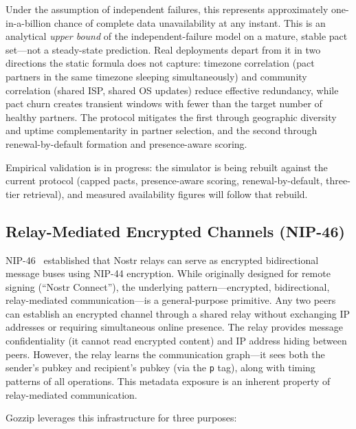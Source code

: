 \documentclass[11pt,a4paper]{article}
\begin{document}
Under the assumption of independent failures, this represents approximately one-in-a-billion chance of complete data unavailability at any instant. This is an analytical \emph{upper bound} of the independent-failure model on a mature, stable pact set---not a steady-state prediction. Real deployments depart from it in two directions the static formula does not capture: timezone correlation (pact partners in the same timezone sleeping simultaneously) and community correlation (shared ISP, shared OS updates) reduce effective redundancy, while pact churn creates transient windows with fewer than the target number of healthy partners. The protocol mitigates the first through geographic diversity and uptime complementarity in partner selection, and the second through renewal-by-default formation and presence-aware scoring.

Empirical validation is in progress: the simulator is being rebuilt against the current protocol (capped pacts, presence-aware scoring, renewal-by-default, three-tier retrieval), and measured availability figures will follow that rebuild.

\subsection{Relay-Mediated Encrypted Channels (NIP-46)}

NIP-46~\cite{nip46} established that Nostr relays can serve as encrypted bidirectional message buses using NIP-44 encryption. While originally designed for remote signing (``Nostr Connect''), the underlying pattern---encrypted, bidirectional, relay-mediated communication---is a general-purpose primitive. Any two peers can establish an encrypted channel through a shared relay without exchanging IP addresses or requiring simultaneous online presence.
The relay provides message confidentiality (it cannot read encrypted content) and IP address hiding between peers. However, the relay learns the communication graph---it sees both the sender's pubkey and recipient's pubkey (via the \texttt{p} tag), along with timing patterns of all operations. This metadata exposure is an inherent property of relay-mediated communication.

Gozzip leverages this infrastructure for three purposes:
\end{document}
